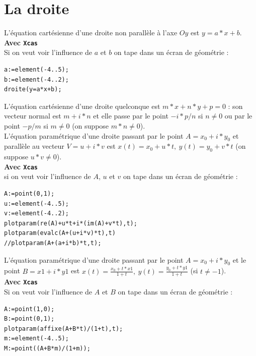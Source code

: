 \documentclass[a4paper,11pt]{book}
\begin{document}
\section{La droite}
L'\'equation cart\'esienne d'une droite non parall\`ele \`a l'axe $Oy$ est 
$y=a*x+b$.\\
{\bf Avec {\tt Xcas}}\\
Si on veut voir l'influence de $a$ et $b$ on tape dans un \'ecran de 
g\'eom\'etrie  :
\begin{verbatim}
a:=element(-4..5);
b:=element(-4..2);
droite(y=a*x+b);
\end{verbatim}
L'\'equation cart\'esienne d'une droite quelconque est $m*x+n*y+p=0$ : son 
vecteur normal est $m+i*n$ et elle passe par le point $-i*p/n$ si $n\neq 0$ ou 
par le point $-p/m$ si $m\neq 0$ (on suppose $m*n \neq 0$).\\
L'\'equation param\'etrique d'une droite passant par le point $A=x_0+i*y_0$ et 
parall\`ele au vecteur $V=u+i*v$ est $x(t)=x_0+u*t,\ y(t)=y_0+v*t$ (on suppose 
$u*v \neq 0$).\\
{\bf Avec {\tt Xcas}}\\
si on veut voir l'influence de $A$, $u$ et $v$ on tape dans un \'ecran de 
g\'eom\'etrie :
\begin{verbatim}
A:=point(0,1);
u:=element(-4..5);
v:=element(-4..2);
plotparam(re(A)+u*t+i*(im(A)+v*t),t);
plotparam(evalc(A+(u+i*v)*t),t)
//plotparam(A+(a+i*b)*t,t);
\end{verbatim}
L'\'equation param\'etrique d'une droite passant par le point $A=x_0+i*y_0$ et 
le point $B=x1+i*y1$ est 
$\displaystyle x(t)=\frac{x_0+t*x1}{1+t},\ y(t)=\frac{y_0+t*y1}{1+t}$ 
(si $t \neq -1$).\\
{\bf Avec {\tt Xcas}}\\
Si on veut voir l'influence de $A$ et $B$ on tape dans un \'ecran de 
g\'eom\'etrie :
\begin{verbatim}
A:=point(1,0);
B:=point(0,1);
plotparam(affixe(A+B*t)/(1+t),t);
m:=element(-4..5);
M:=point((A+B*m)/(1+m));
\end{verbatim}
\end{document}
